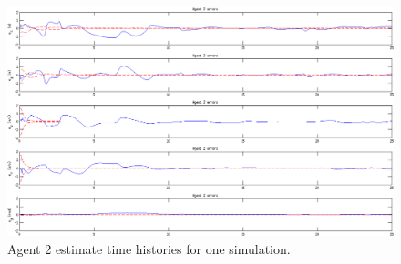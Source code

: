 \documentclass{aiaa-tc}
\begin{document}
\begin{figure}[p]
\centering
\includegraphics[width=\textwidth]{agent2_est.png}
\caption{Agent 2 estimate time histories for one simulation.}
\label{fig:agent2_est}
\end{figure}
\end{document}
